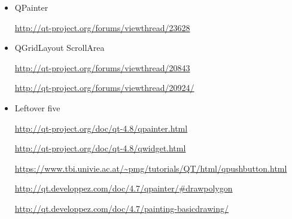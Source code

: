 \documentclass[9pt,b5paper]{article}
\begin{document}
\begin{itemize}
\item QPainter

\url{http://qt-project.org/forums/viewthread/23628}

\item QGridLayout ScrollArea

\url{http://qt-project.org/forums/viewthread/20843}

\url{http://qt-project.org/forums/viewthread/20924/}

\item Leftover five

\url{http://qt-project.org/doc/qt-4.8/qpainter.html}

\url{http://qt-project.org/doc/qt-4.8/qwidget.html}

\url{https://www.tbi.univie.ac.at/~pmg/tutorials/QT/html/qpushbutton.html}

\url{http://qt.developpez.com/doc/4.7/qpainter/#drawpolygon}

\url{http://qt.developpez.com/doc/4.7/painting-basicdrawing/}
\end{itemize}
\end{document}
